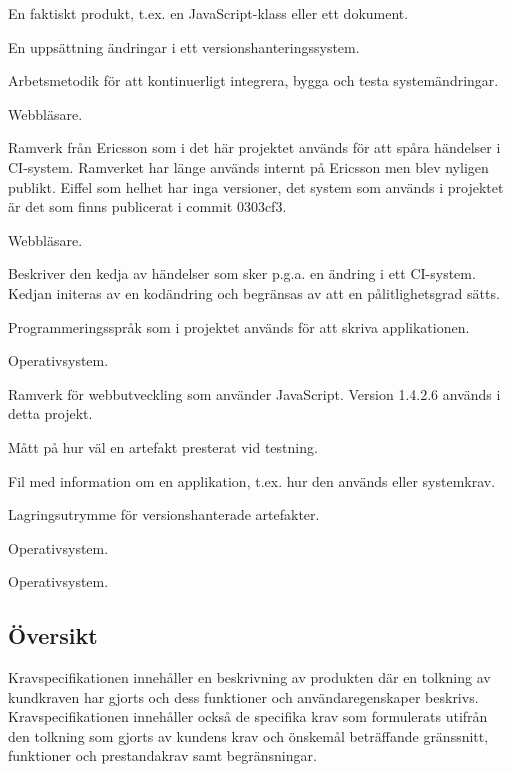 \begin{description}[leftmargin=!,labelwidth=\widthof{\bfseries Continous Integration}]
\item[Artefakt] En faktiskt produkt, t.ex. en JavaScript-klass eller ett dokument.
\item[Commit] En uppsättning ändringar i ett versionshanteringssystem.
\item[Continous Integration] Arbetsmetodik för att kontinuerligt integrera, bygga och testa systemändringar.
\item[Chrome] Webbläsare.
\item[Eiffel] Ramverk från Ericsson som i det här projektet används för att spåra händelser i CI-system. Ramverket har länge används internt på Ericsson men blev nyligen publikt. Eiffel som helhet har inga versioner, det system som används i projektet är det som finns publicerat i commit 0303cf3. \cite{website:eiffel}
\item[Firefox] Webbläsare.
\item[Händelseförlopp] Beskriver den kedja av händelser som sker p.g.a. en ändring i ett CI-system. Kedjan initeras av en kodändring och begränsas av att en pålitlighetsgrad sätts.
\item[JavaScript] Programmeringsspråk som i projektet används för att skriva applikationen.
\item[macOS] Operativsystem.
\item[Meteor] Ramverk för webbutveckling som använder JavaScript. Version 1.4.2.6 används i detta projekt. \cite{website:meteor}
\item[Pålitlighetsgrad] Mått på hur väl en artefakt presterat vid testning.
\item[README-fil] Fil med information om en applikation, t.ex. hur den används eller systemkrav.
\item[Repository, repo] Lagringsutrymme för versionshanterade artefakter.
\item[Ubuntu] Operativsystem.
\item[Windows] Operativsystem.
\end{description}

\subsection{Översikt}
Kravspecifikationen innehåller en beskrivning av produkten där en tolkning av kundkraven har gjorts och dess funktioner och användaregenskaper beskrivs. Kravspecifikationen innehåller också de specifika krav som formulerats utifrån den tolkning som gjorts av kundens krav och önskemål beträffande gränssnitt, funktioner och prestandakrav samt begränsningar.